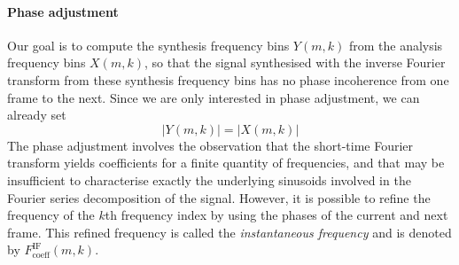 \documentclass[letterpaper]{article}
\begin{document}
\paragraph{Phase adjustment}
Our goal is to compute the synthesis frequency bins \(Y(m,k)\) from the analysis
frequency bins \(X(m,k)\), so that the signal synthesised with the inverse
Fourier transform from these synthesis frequency bins has no phase incoherence
from one frame to the next. Since we are only interested in phase adjustment,
we can already set
\begin{equation}
    |Y(m,k)| = |X(m,k)|
\end{equation}
The phase adjustment involves the observation that the short-time Fourier
transform yields coefficients for a finite quantity of frequencies, and that may
be insufficient to characterise exactly the underlying sinusoids involved in the
Fourier series decomposition of the signal. However, it is possible to refine
the frequency of the \(k\)th frequency index by using the phases of the current
and next frame. This refined frequency is called the \emph{instantaneous
frequency} and is denoted by \(F_{\text{coeff}}^{\text{IF}}(m,k)\).
\end{document}
